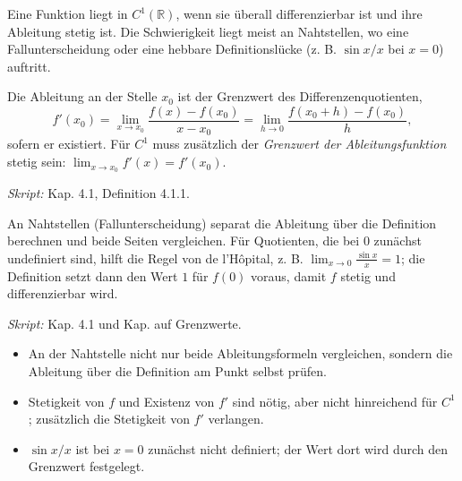 

Eine Funktion liegt in $C^1(\mathbb R)$, wenn sie überall differenzierbar ist
und ihre Ableitung stetig ist. Die Schwierigkeit liegt meist an
Nahtstellen, wo eine Fallunterscheidung oder eine hebbare Definitionslücke
(z. B. $\sin x / x$ bei $x=0$) auftritt.

\begin{werkzeugkasten}
Die Ableitung an der Stelle $x_0$ ist der Grenzwert des Differenzenquotienten,
\begin{equation}
  f'(x_0)=\lim_{x\to x_0}\frac{f(x)-f(x_0)}{x-x_0}
  =\lim_{h\to0}\frac{f(x_0+h)-f(x_0)}{h},
\end{equation}
sofern er existiert. Für $C^1$ muss zusätzlich der \emph{Grenzwert der
Ableitungsfunktion} stetig sein: $\lim_{x\to x_0} f'(x)=f'(x_0)$.

\textit{Skript:} Kap. 4.1, Definition 4.1.1.
\end{werkzeugkasten}

\begin{werkzeugkasten}
An Nahtstellen (Fallunterscheidung) separat die Ableitung über die Definition
berechnen und beide Seiten vergleichen. Für Quotienten, die bei $0$ zunächst
undefiniert sind, hilft die Regel von de l'Hôpital, z. B.
$\lim_{x\to0}\frac{\sin x}{x}=1$; die Definition setzt dann den Wert $1$
für $f(0)$ voraus, damit $f$ stetig und differenzierbar wird.

\textit{Skript:} Kap. 4.1 und Kap. auf Grenzwerte.
\end{werkzeugkasten}

\begin{achtung}
\begin{itemize}
  \item An der Nahtstelle nicht nur beide Ableitungsformeln vergleichen, sondern
        die Ableitung über die Definition am Punkt selbst prüfen.
  \item Stetigkeit von $f$ und Existenz von $f'$ sind nötig, aber nicht
        hinreichend für $C^1$; zusätzlich die Stetigkeit von $f'$ verlangen.
  \item $\sin x/x$ ist bei $x=0$ zunächst nicht definiert; der Wert dort wird
        durch den Grenzwert festgelegt.
\end{itemize}
\end{achtung}
